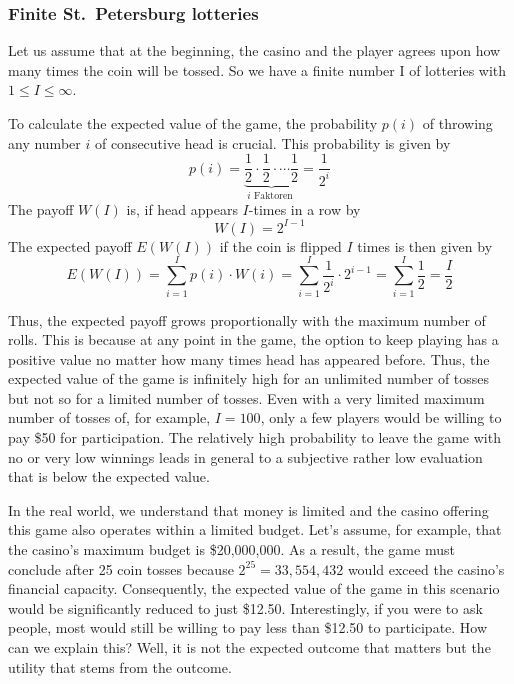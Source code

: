 \documentclass[
  12pt,
  oneside]{book}
\theoremstyle{definition}
\theoremstyle{definition}
\theoremstyle{definition}
\theoremstyle{definition}
\theoremstyle{remark}
\begin{document}
\hypertarget{finite-st.-petersburg-lotteries}{%
\subsubsection{Finite St.~Petersburg lotteries}\label{finite-st.-petersburg-lotteries}}

Let us assume that at the beginning, the casino and the player agrees upon how many times the coin will be tossed. So we have a finite number I of lotteries with \(1 \leq I \leq \infty\).

To calculate the expected value of the game, the probability \(p(i)\) of throwing any number \(i\) of consecutive head is crucial. This probability is given by
\[
p(i)=\underbrace{\frac{1}{2} \cdot \frac{1}{2} \cdot \cdots \frac{1}{2}}_{i \text { Faktoren }}=\frac{1}{2^{i}}
\]
The payoff \(W(I)\) is, if head appears \(I\)-times in a row by
\[
W(I)=2^{I-1}
\]
The expected payoff \(E(W(I))\) if the coin is flipped \(I\) times is then given by
\[
E(W(I))=\sum_{i=1}^{I} p(i) \cdot W(i)=\sum_{i=1}^{I} \frac{1}{2^{i}} \cdot 2^{i-1}=\sum_{i=1}^{I} \frac{1}{2}=\frac{I}{2}
\]

Thus, the expected payoff grows proportionally with the maximum number of rolls. This is because at any point in the game, the option to keep playing has a positive value no matter how many times head has appeared before.
Thus, the expected value of the game is infinitely high for an unlimited number of tosses but not so for a limited number of tosses. Even with a very limited maximum number of tosses of, for example, \(I = 100\), only a few players would be willing to pay
\$50 for participation. The relatively high probability to leave the game with no or very low winnings leads in general to a subjective rather low evaluation that is below the expected value.

In the real world, we understand that money is limited and the casino offering this game also operates within a limited budget.
Let's assume, for example, that the casino's maximum budget is \$20,000,000. As a result, the game must conclude after 25 coin tosses because \(2^{25} = 33,554,432\) would exceed the casino's financial capacity. Consequently, the expected value of the game in this scenario would be significantly reduced to just \$12.50.
Interestingly, if you were to ask people, most would still be willing to pay less than \$12.50 to participate. How can we explain this? Well, it is not the expected outcome that matters but the utility that stems from the outcome.
\end{document}
